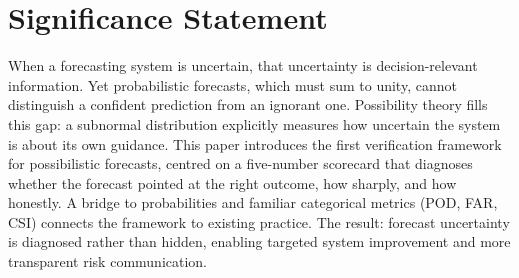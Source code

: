 
\section*{Significance Statement}
\begingroup
{}
When a forecasting system is uncertain, that uncertainty
is decision-relevant information.
Yet probabilistic forecasts, which must sum to unity,
cannot distinguish a confident prediction from an
ignorant one.
Possibility theory fills this gap: a subnormal
distribution explicitly measures how uncertain the
system is about its own guidance.
This paper introduces the first verification framework
for possibilistic forecasts, centred on a five-number
scorecard that diagnoses whether the forecast pointed
at the right outcome, how sharply, and how honestly.
A bridge to probabilities and familiar categorical
metrics (POD, FAR, CSI) connects the framework to
existing practice.
The result: forecast uncertainty is diagnosed rather
than hidden, enabling targeted system improvement and
more transparent risk communication.
\endgroup

